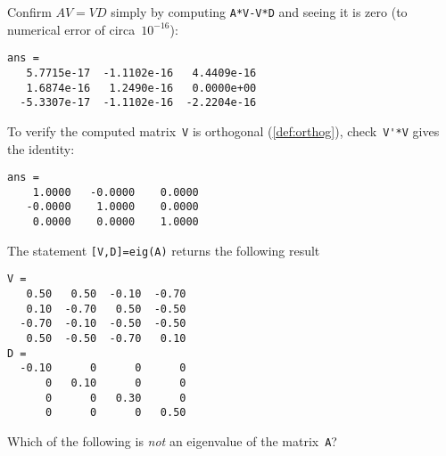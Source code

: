 \begin{example}
\begin{solution}
\begin{itemize}
\end{itemize}
Confirm \(AV=VD\) simply by computing \verb|A*V-V*D| and seeing it is zero (to numerical error of circa~\(10^{-16}\)):
\begin{verbatim}
ans =
   5.7715e-17  -1.1102e-16   4.4409e-16
   1.6874e-16   1.2490e-16   0.0000e+00
  -5.3307e-17  -1.1102e-16  -2.2204e-16
\end{verbatim}
To verify the computed matrix~\verb|V| is orthogonal (\autoref{def:orthog}), check~\verb|V'*V| gives the identity:
\begin{verbatim}
ans =
    1.0000   -0.0000    0.0000
   -0.0000    1.0000    0.0000
    0.0000    0.0000    1.0000
\end{verbatim}
\end{solution}
\end{example}




\begin{activity}
The statement \verb|[V,D]=eig(A)| returns the following result \twodp
\begin{verbatim}
V =
   0.50   0.50  -0.10  -0.70
   0.10  -0.70   0.50  -0.50
  -0.70  -0.10  -0.50  -0.50
   0.50  -0.50  -0.70   0.10
D =
  -0.10      0      0      0
      0   0.10      0      0
      0      0   0.30      0
      0      0      0   0.50
\end{verbatim}
Which of the following is \emph{not} an eigenvalue of the matrix~\verb|A|?
\end{activity}





